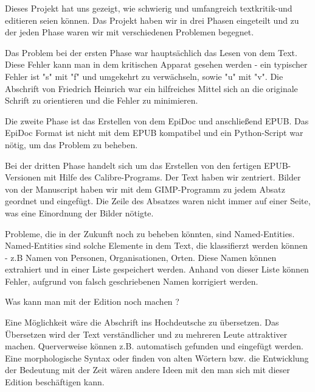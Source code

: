 \documentclass[a4paper, 12pt, oneside]{scrbook}
\begin{document}
Dieses Projekt hat uns gezeigt, wie schwierig und umfangreich textkritik-und editieren seien können. Das Projekt haben wir in drei Phasen eingeteilt und zu der jeden Phase waren wir mit verschiedenen Problemen begegnet. 

Das Problem bei der ersten Phase war hauptsächlich das Lesen von dem Text. Diese Fehler kann man in dem kritischen Apparat gesehen werden - ein typischer Fehler ist "s" mit "f" und umgekehrt zu verwächseln, sowie "u" mit "v". Die Abschrift von Friedrich Heinrich war ein hilfreiches Mittel sich an die originale Schrift zu orientieren und die Fehler zu minimieren.

Die zweite Phase ist das Erstellen von dem EpiDoc und anschließend EPUB. Das EpiDoc Format ist nicht mit dem EPUB kompatibel und ein Python-Script war nötig, um das Problem zu beheben. 

Bei der dritten Phase handelt sich um das Erstellen von den fertigen EPUB-Versionen mit Hilfe des Calibre-Programs. Der Text haben wir zentriert. Bilder von der Manuscript haben wir mit dem GIMP-Programm zu jedem Absatz geordnet und eingefügt. Die Zeile des Absatzes waren nicht immer auf einer Seite, was eine Einordnung der Bilder nötigte. 

Probleme, die in der Zukunft noch zu beheben könnten, sind Named-Entities. Named-Entities sind solche Elemente in dem Text, die klassifierzt werden können - z.B Namen von Personen, Organisationen, Orten. Diese Namen können extrahiert und in einer Liste gespeichert werden. Anhand von dieser Liste können Fehler, aufgrund von falsch geschriebenen Namen korrigiert werden. 


Was kann man mit der Edition noch machen ? 

Eine Möglichkeit wäre die Abschrift ins Hochdeutsche zu übersetzen. Das Übersetzen wird der Text verständlicher und zu mehreren Leute attraktiver machen. 
Querverweise können z.B. automatisch gefunden und eingefügt werden. Eine morphologische Syntax oder finden von alten Wörtern bzw. die Entwicklung der Bedeutung mit der Zeit wären andere Ideen mit den man sich mit dieser Edition beschäftigen kann. 
 

\printbibliography
\end{document}
